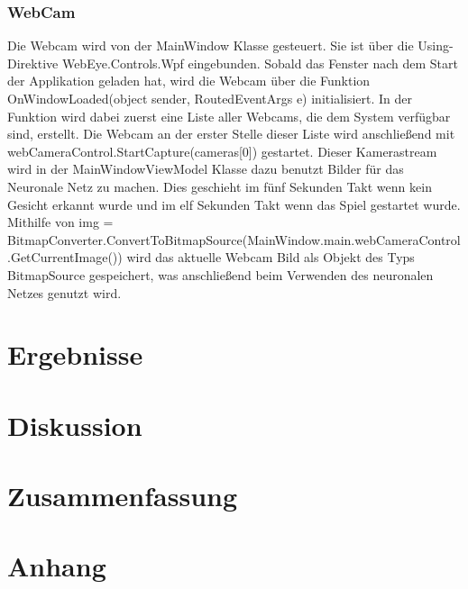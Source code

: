 \documentclass[12pt,a4paper,headinclude,twoside, plainheadsepline, open=right,numbers=noenddot]{scrreprt}
\begin{document}
\subsection{WebCam}
Die Webcam wird von der MainWindow Klasse gesteuert. Sie ist über die Using-Direktive WebEye.Controls.Wpf eingebunden.   Sobald das Fenster nach dem Start der Applikation geladen hat, wird die Webcam über die Funktion
 OnWindowLoaded(object sender, RoutedEventArgs e) initialisiert. In der Funktion wird dabei zuerst eine Liste aller Webcams, die dem System verfügbar sind, erstellt.  Die Webcam an der erster Stelle dieser Liste wird anschließend mit webCameraControl.StartCapture(cameras[0]) 	gestartet. Dieser Kamerastream wird in der MainWindowViewModel Klasse dazu benutzt Bilder für das Neuronale Netz zu machen. Dies geschieht im fünf Sekunden Takt wenn kein Gesicht erkannt wurde und im elf Sekunden Takt wenn das Spiel gestartet wurde. Mithilfe von img = BitmapConverter.ConvertToBitmapSource(MainWindow.main.webCameraControl.GetCurrentImage()) wird das aktuelle Webcam Bild 
als Objekt des Typs BitmapSource gespeichert, was anschließend beim Verwenden des neuronalen Netzes genutzt wird.






\chapter{Ergebnisse}

\chapter{Diskussion}

\chapter{Zusammenfassung}




\printbibliography


\appendix
\chapter{Anhang}
\end{document}
